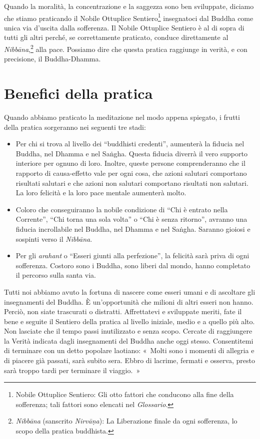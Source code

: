 Quando la moralità, la concentrazione e la saggezza sono ben sviluppate,
diciamo che stiamo praticando il Nobile Ottuplice Sentiero\footnote{Nobile
  Ottuplice Sentiero: Gli otto fattori che conducono alla fine della
  sofferenza; tali fattori sono elencati nel \emph{Glossario}.}
insegnatoci dal Buddha come unica via d'uscita dalla sofferenza. Il
Nobile Ottuplice Sentiero è al di sopra di tutti gli altri perché, se
correttamente praticato, conduce direttamente al
\emph{Nibbāna},\footnote{\emph{Nibbāna} (sanscrito \emph{Nirvāṇa}): La
  Liberazione finale da ogni sofferenza, lo scopo della pratica
  buddhista.} alla pace. Possiamo dire che questa pratica raggiunge in
verità, e con precisione, il Buddha-Dhamma.

\section{Benefici della pratica}

Quando abbiamo praticato la meditazione nel modo appena spiegato, i
frutti della pratica sorgeranno nei seguenti tre stadi:

\begin{itemize}

\item Per chi si trova al livello dei ``buddhisti credenti'', aumenterà
  la fiducia nel Buddha, nel Dhamma e nel Saṅgha. Questa fiducia diverrà
  il vero supporto interiore per ognuno di loro. Inoltre, queste persone
  comprenderanno che il rapporto di causa-effetto vale per ogni cosa,
  che azioni salutari comportano risultati salutari e che azioni non
  salutari comportano risultati non salutari. La loro felicità e la loro
  pace mentale aumenterà molto.

\item Coloro che conseguiranno la nobile condizione di ``Chi è entrato nella
  Corrente'', ``Chi torna una sola volta'' o ``Chi è senza ritorno'', avranno
  una fiducia incrollabile nel Buddha, nel Dhamma e nel Saṅgha. Saranno gioiosi
  e sospinti verso il \emph{Nibbāna}.

\item Per gli \emph{arahant} o ``Esseri giunti alla perfezione'', la felicità
  sarà priva di ogni sofferenza. Costoro sono i Buddha, sono liberi dal mondo,
  hanno completato il percorso sulla santa via.

\end{itemize}

Tutti noi abbiamo avuto la fortuna di nascere come esseri umani e di
ascoltare gli insegnamenti del Buddha. È un'opportunità che milioni di
altri esseri non hanno. Perciò, non siate trascurati o distratti.
Affrettatevi e sviluppate meriti, fate il bene e seguite il Sentiero
della pratica al livello iniziale, medio e a quello più alto. Non
lasciate che il tempo passi inutilizzato e senza scopo. Cercate di
raggiungere la Verità indicata dagli insegnamenti del Buddha anche oggi
stesso. Consentitemi di terminare con un detto popolare laotiano:
«~Molti sono i momenti di allegria e di piacere già passati, sarà subito
sera. Ebbro di lacrime, fermati e osserva, presto sarà troppo tardi per
terminare il viaggio.~»

